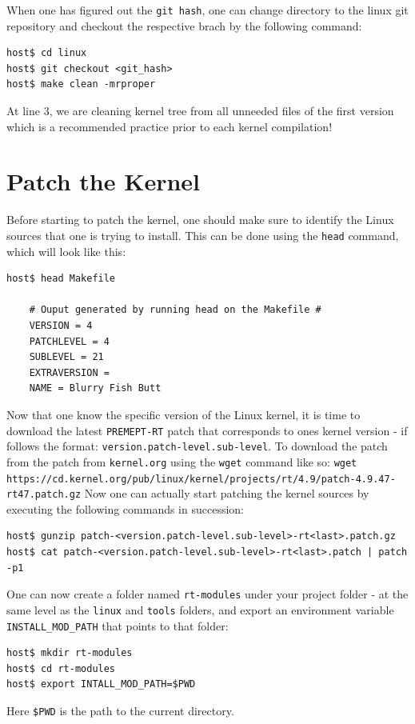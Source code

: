 \documentclass[a4paper,oneside,onecolumn]{article}
\newcommand{\code}[1]{\colorbox{codegray}{\texttt{#1}}}
\begin{document}
When one has figured out the \texttt{git hash}, one can change directory to the linux git repository and checkout the respective brach by the following command:
\begin{lstlisting}
host$ cd linux
host$ git checkout <git_hash>
host$ make clean -mrproper
\end{lstlisting}
At line 3, we are cleaning kernel tree from all unneeded files of the first version which is a recommended practice prior to each kernel compilation!

\section{Patch the Kernel}
Before starting to patch the kernel, one should make sure to identify the Linux sources that one is trying to install. This can be done using the \code{head} command, which will look like this:
\begin{lstlisting}
host$ head Makefile

	# Ouput generated by running head on the Makefile #
	VERSION = 4
	PATCHLEVEL = 4
	SUBLEVEL = 21
	EXTRAVERSION = 
	NAME = Blurry Fish Butt
\end{lstlisting}
Now that one know the specific version of the Linux kernel, it is time to download the latest \texttt{PREMEPT-RT} patch that corresponds to ones kernel version - if follows the format: \texttt{version.patch-level.sub-level}.
\newline
To download the patch from the patch from \texttt{kernel.org} using the \code{wget} command like so: 
\newline
\code{wget https://cd.kernel.org/pub/linux/kernel/projects/rt/4.9/patch-4.9.47-rt47.patch.gz}
\newline
\newline
Now one can actually start patching the kernel sources by executing the following commands in succession:
\begin{lstlisting}
host$ gunzip patch-<version.patch-level.sub-level>-rt<last>.patch.gz
host$ cat patch-<version.patch-level.sub-level>-rt<last>.patch | patch -p1
\end{lstlisting}
One can now create a folder named \texttt{rt-modules} under your project folder - at the same level as the \texttt{linux} and \texttt{tools} folders, and export an environment variable \texttt{INSTALL\_MOD\_PATH} that points to that folder:
\begin{lstlisting}
host$ mkdir rt-modules
host$ cd rt-modules
host$ export INTALL_MOD_PATH=$PWD
\end{lstlisting}
Here \code{\$PWD} is the path to the current directory.
\end{document}
